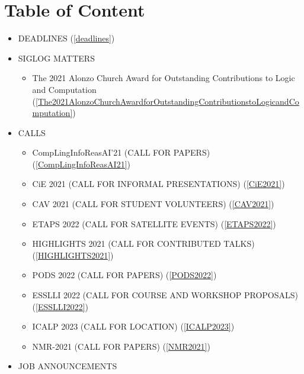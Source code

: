 \documentclass[prodmode,acmtecs]{acmsmall} %
\begin{document}
\section{Table of Content}\begin{itemize}\item DEADLINES (\cref{deadlines}) 
 
\item SIGLOG MATTERS 
 
\begin{itemize}\item The 2021 Alonzo Church Award for Outstanding Contributions to Logic and Computation (\cref{The2021AlonzoChurchAwardforOutstandingContributionstoLogicandComputation})
\end{itemize} 
\item CALLS 
 
\begin{itemize}\item CompLingInfoReasAI'21 (CALL FOR PAPERS) (\cref{CompLingInfoReasAI21})
\item CiE 2021 (CALL FOR INFORMAL PRESENTATIONS) (\cref{CiE2021})
\item CAV 2021 (CALL FOR STUDENT VOLUNTEERS) (\cref{CAV2021})
\item ETAPS 2022 (CALL FOR SATELLITE EVENTS) (\cref{ETAPS2022})
\item HIGHLIGHTS 2021 (CALL FOR CONTRIBUTED TALKS) (\cref{HIGHLIGHTS2021})
\item PODS 2022 (CALL FOR PAPERS) (\cref{PODS2022})
\item ESSLLI 2022 (CALL FOR COURSE AND WORKSHOP PROPOSALS) (\cref{ESSLLI2022})
\item ICALP 2023 (CALL FOR LOCATION) (\cref{ICALP2023})
\item NMR-2021 (CALL FOR PAPERS) (\cref{NMR2021})
\end{itemize} 
\item JOB ANNOUNCEMENTS 
 

\end{itemize}
\end{document}
